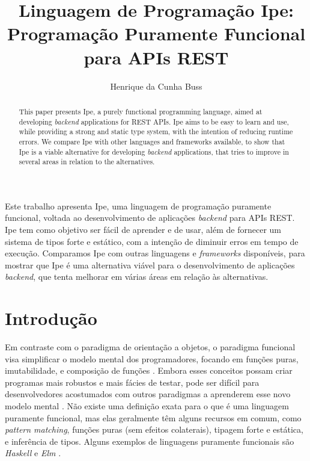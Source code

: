 \documentclass[12pt]{article}
\title{Linguagem de Programação Ipe: Programação Puramente Funcional para APIs REST}
\author{Henrique da Cunha Buss\inst{1}}
\begin{document}
\maketitle

\begin{abstract}
  This paper presents Ipe, a purely functional programming language, aimed at developing
  \textit{backend} applications for REST APIs. Ipe aims to be easy to learn and use, while providing
  a strong and static type system, with the intention of reducing runtime errors. We compare Ipe
  with other languages and frameworks available, to show that Ipe is a viable alternative for
  developing \textit{backend} applications, that tries to improve in several areas in relation to
  the alternatives.
\end{abstract}

\begin{resumo}
  Este trabalho apresenta Ipe, uma linguagem de programação puramente funcional, voltada ao
  desenvolvimento de aplicações \textit{backend} para APIs REST. Ipe tem como objetivo ser fácil de
  aprender e de usar, além de fornecer um sistema de tipos forte e estático, com a intenção de diminuir
  erros em tempo de execução. Comparamos Ipe com outras linguagens e \textit{frameworks} disponíveis,
  para mostrar que Ipe é uma alternativa viável para o desenvolvimento de aplicações \textit{backend},
  que tenta melhorar em várias áreas em relação às alternativas.
\end{resumo}


\section{Introdução}

Em contraste com o paradigma de orientação a objetos, o paradigma funcional visa simplificar o modelo
mental dos programadores, focando em funções puras, imutabilidade, e composição de funções \cite{functionalprogramming-future}.
Embora esses conceitos possam criar programas mais robustos e mais fácies de testar, pode ser difícil
para desenvolvedores acostumados com outros paradigmas a aprenderem esse novo modelo mental \cite{promisesoffp}.
Não existe uma definição exata para o que é uma linguagem puramente funcional, mas elas geralmente
têm alguns recursos em comum, como \textit{pattern matching}, funções puras (sem efeitos colaterais),
tipagem forte e estática, e inferência de tipos. Alguns exemplos de linguagens puramente funcionais
são \textit{Haskell} \cite{haskellintroduction} e \textit{Elm} \cite{czaplicki2012elm}.
\end{document}
